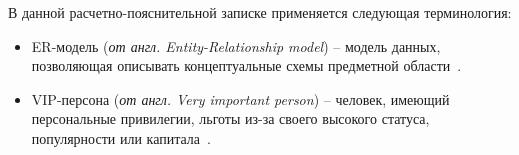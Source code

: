 
В данной расчетно-пояснительной записке применяется следующая терминология:
\begin{itemize}[label=]
	\item ER-модель (\textit{от англ. Entity-Relationship model}) -- модель данных, позволяющая описывать концептуальные схемы предметной области~\cite{lit5}.
	\item VIP-персона (\textit{от англ. Very important person}) -- человек, имеющий персональные привилегии, льготы из-за своего высокого статуса, популярности или капитала~\cite{lit6}. 
\end{itemize}

\clearpage
